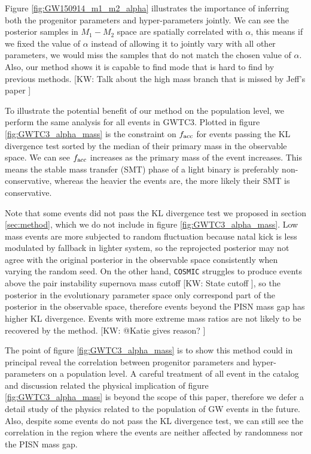 \documentclass[twocolumn]{aastex631}
\newcommand{\kw}[1]{{\color{rb4}[KW: #1 ]}}
\begin{document}
Figure \ref{fig:GW150914_m1_m2_alpha} illustrates the importance of inferring both the progenitor parameters and hyper-parameters jointly.
We can see the posterior samples in $M_1-M_2$ space are spatially correlated with $\alpha$,
this means if we fixed the value of $\alpha$ instead of allowing it to jointly vary with all other parameters,
we would miss the samples that do not match the chosen value of $\alpha$.
Also, our method shows it is capable to find mode that is hard to find by previous methods.
\kw{Talk about the high mass branch that is missed by Jeff's paper}

To illustrate the potential benefit of our method on the population level, we perform the same analysis for all events in GWTC3.
Plotted in figure \ref{fig:GWTC3_alpha_mass} is the constraint on $f_{\rm acc}$ for events passing the KL divergence test sorted by the median of their primary mass in the observable space.
We can see $f_{\rm acc}$ increases as the primary mass of the event increases.
This means the stable mass transfer (SMT) phase of a light binary is preferably non-conservative, whereas the heavier the events are, the more likely their SMT is conservative.

Note that some events did not pass the KL divergence test we proposed in section \ref{sec:method}, which we do not include in figure \ref{fig:GWTC3_alpha_mass}.
Low mass events are more subjected to random fluctuation because natal kick is less modulated by fallback in lighter system,
so the reprojected posterior may not agree with the original posterior in the observable space consistently when varying the random seed.
On the other hand, \texttt{COSMIC} struggles to produce events above the pair instability supernova mass cutoff \kw{State cutoff},
so the posterior in the evolutionary parameter space only correspond part of the posterior in the observable space, therefore events beyond the PISN mass gap has higher KL divergence.
Events with more extreme mass ratios are not likely to be recovered by the method. \kw{@Katie gives reason?}

The point of figure \ref{fig:GWTC3_alpha_mass} is to show this method could in principal reveal the correlation between progenitor parameters and hyper-parameters on a population level.
A careful treatment of all event in the catalog and discussion related the physical implication of figure \ref{fig:GWTC3_alpha_mass} is beyond the scope of this paper,
therefore we defer a detail study of the physics related to the population of GW events in the future.
Also, despite some events do not pass the KL divergence test, we can still see the correlation in the region where the events are neither affected by randomness nor the PISN mass gap.
\end{document}

